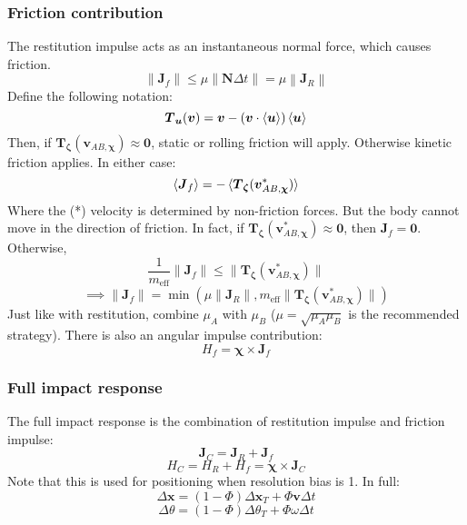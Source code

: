 \documentclass[10pt]{report}
\DeclareMathOperator{\eff}{eff}
\begin{document}
\subsubsection{Friction contribution}
The restitution impulse acts as an instantaneous normal force, which causes friction.
\begin{equation}\|\boldsymbol{J}_f\|\leq\mu\|\boldsymbol{N}\Delta t\|=\mu\left\|\boldsymbol{J}_R\right\|\end{equation}
Define the following notation:
\begin{equation}\boldsymbol{T}_{\boldsymbol{u}}(\boldsymbol{v})=\boldsymbol{v}-(\boldsymbol{v}\cdot\braket{\boldsymbol{u}})\braket{\boldsymbol{u}}\end{equation}
Then, if $\boldsymbol{T}_{\boldsymbol{\zeta}}(\boldsymbol{v}_{AB,\boldsymbol{\chi}})\approx\boldsymbol{0}$, static or rolling friction will apply. Otherwise kinetic friction applies. In either case:
\begin{equation}\braket{\boldsymbol{J}_f}=-\braket{\boldsymbol{T}_{\boldsymbol{\zeta}}(\boldsymbol{v}_{AB,\boldsymbol{\chi}}^*)}\end{equation}
Where the (*) velocity is determined by non-friction forces. But the body cannot move in the direction of friction. In fact, if $\boldsymbol{T}_{\boldsymbol{\zeta}}(\boldsymbol{v}_{AB,\boldsymbol{\chi}}^*)\approx\boldsymbol{0}$, then $\boldsymbol{J}_f=\boldsymbol{0}$. Otherwise,
\begin{equation}\frac{1}{m_{\eff}}\|\boldsymbol{J}_f\|\leq\|\boldsymbol{T}_{\boldsymbol{\zeta}}(\boldsymbol{v}_{AB,\boldsymbol{\chi}}^*)\|\end{equation}
\begin{equation}\implies\|\boldsymbol{J}_f\|=\min(\mu\|\boldsymbol{J}_R\|, m_{\eff}\|\boldsymbol{T}_{\boldsymbol{\zeta}}(\boldsymbol{v}_{AB,\boldsymbol{\chi}}^*)\|)\end{equation}
Just like with restitution, combine $\mu_A$ with $\mu_B$ ($\mu=\sqrt{\mu_A\mu_B}$ is the recommended strategy). There is also an angular impulse contribution:
\begin{equation}H_f=\boldsymbol{\chi}\times\boldsymbol{J}_f\end{equation}

\subsubsection{Full impact response}
The full impact response is the combination of restitution impulse and friction impulse:
\begin{equation}\boldsymbol{J}_C=\boldsymbol{J}_R+\boldsymbol{J}_f\end{equation}
\begin{equation}H_C=H_R+H_f=\boldsymbol{\chi}\times\boldsymbol{J}_C\end{equation}
Note that this is used for positioning when resolution bias is 1. In full:
\begin{equation}\Delta\boldsymbol{x}=(1-\Phi)\Delta\boldsymbol{x}_T+\Phi\boldsymbol{v}\Delta t\end{equation}
\begin{equation}\Delta\theta=(1-\Phi)\Delta\theta_T+\Phi\omega\Delta t\end{equation}
\end{document}
